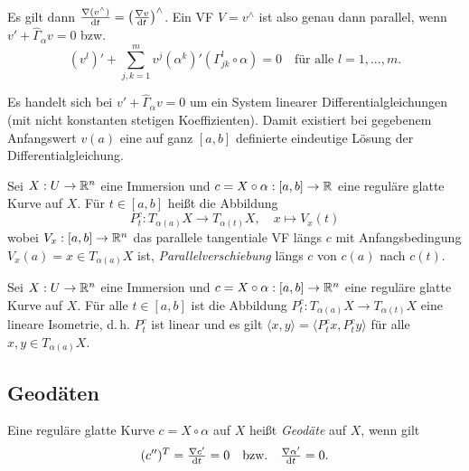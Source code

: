 \documentclass{cheat-sheet}
\let\mySum\sum
\DeclareMathOperator*{\textsum}{{\textstyle \mySum}}
\renewcommand{\sum}{\textsum\limits}
\begin{document}
\begin{satz}
  Es gilt dann $\tfrac{\nabla (v^\wedge)}{\mathrm{d} t} = \left( \tfrac{\nabla v}{\mathrm{d} t} \right)^\wedge$. Ein VF $V = v^\wedge$ ist also genau dann parallel, wenn $v' + \hat{\Gamma}_\alpha v = 0$ bzw.
  \[ (v^l)' + \sum_{j,k=1}^m v^j (\alpha^k)' (\Gamma_{jk}^l \circ \alpha) = 0 \quad \text{für alle $l = 1, ..., m$.} \]
\end{satz}

\begin{bem}
  Es handelt sich bei $v' + \hat{\Gamma}_\alpha v = 0$ um ein System linearer Differentialgleichungen (mit nicht konstanten stetigen Koeffizienten). Damit existiert bei gegebenem Anfangswert $v(a)$ eine auf ganz $[a, b]$ definierte eindeutige Lösung der Differentialgleichung.
\end{bem}

\begin{defn}
  Sei $X : U \to \mathbb{R}^n$ eine Immersion und $c = X \circ \alpha : [a, b] \to \mathbb{R}$ eine reguläre glatte Kurve auf $X$. Für $t \in [a, b]$ heißt die Abbildung
  \[ P_t^c : T_{\alpha(a)} X \to T_{\alpha(t)} X, \quad x \mapsto V_x(t) \]
  wobei $V_x : [a, b] \to \mathbb{R}^n$ das parallele tangentiale VF längs $c$ mit Anfangsbedingung $V_x(a) = x \in T_{\alpha(a)} X$ ist, \emph{Parallelverschiebung} längs $c$ von $c(a)$ nach $c(t)$.
\end{defn}

\begin{samepage}

\begin{satz}
  Sei $X : U \to \mathbb{R}^n$ eine Immersion und $c = X \circ \alpha : [a, b] \to \mathbb{R}^n$ eine reguläre glatte Kurve auf $X$. Für alle $t \in [a, b]$ ist die Abbildung $P_t^c : T_{\alpha(a)} X \to T_{\alpha(t)} X$ eine lineare Isometrie, d.\,h. $P_t^c$ ist linear und es gilt $\langle x, y \rangle = \langle P_t^c x, P_t^c y \rangle$ für alle $x, y \in T_{\alpha(a)} X$.
\end{satz}


\subsection{Geodäten}

\end{samepage}

\begin{defn}
  Eine reguläre glatte Kurve $c = X \circ \alpha$ auf $X$ heißt \emph{Geodäte} auf $X$, wenn gilt
  \[ (c'')^T = \tfrac{\nabla c'}{\mathrm{d} t} = 0 \quad\text{bzw.}\quad \tfrac{\nabla \alpha'}{\mathrm{d} t} = 0. \]
\end{defn}
\end{document}
